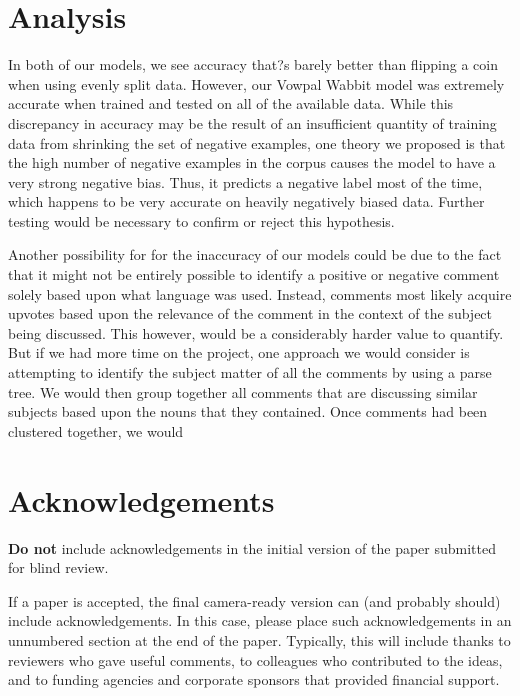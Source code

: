 \documentclass{article}
\begin{document}
\section{Analysis} 
In both of our models, we see accuracy that?s barely better than flipping a coin when using evenly split data. However, our Vowpal Wabbit model was extremely accurate when trained and tested on all of the available data. While this discrepancy in accuracy may be the result of an insufficient quantity of training data from shrinking the set of negative examples, one theory we proposed is that the high number of negative examples in the corpus causes the model to have a very strong negative bias. Thus, it predicts a negative label most of the time, which happens to be very accurate on heavily negatively biased data. Further testing would be necessary to confirm or reject this hypothesis. 

Another possibility for for the inaccuracy of our models could be due to the fact that it might not be entirely possible to identify a positive or negative comment solely based upon what language was used. Instead, comments most likely acquire upvotes based upon the relevance of the comment in the context of the subject being discussed. This however, would be a considerably harder value to quantify. But if we had more time on the project, one approach we would consider is attempting to identify the subject matter of all the comments by using a parse tree. We would then group together all comments that are discussing similar subjects based upon the nouns that they contained. Once comments had been clustered together, we would 

\section*{Acknowledgements} 
 
\textbf{Do not} include acknowledgements in the initial version of
the paper submitted for blind review.

If a paper is accepted, the final camera-ready version can (and
probably should) include acknowledgements. In this case, please
place such acknowledgements in an unnumbered section at the
end of the paper. Typically, this will include thanks to reviewers
who gave useful comments, to colleagues who contributed to the ideas, 
and to funding agencies and corporate sponsors that provided financial 
support.  


\nocite{langley00}



\end{document}

